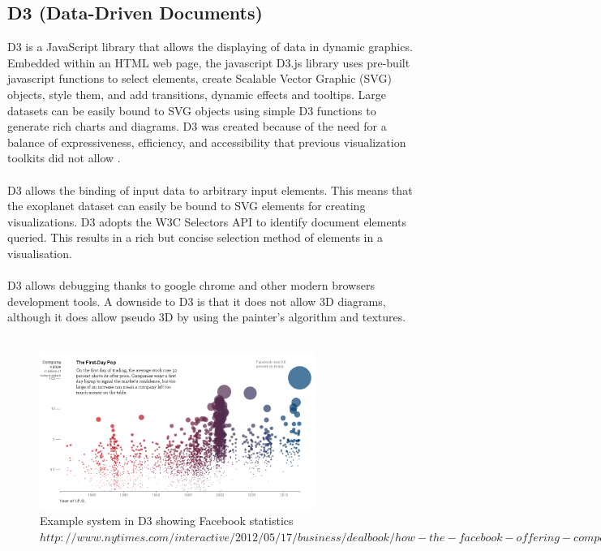\documentclass[11pt
              , a4paper
              , twoside
              , openright
              ]{report}
\begin{document}
\subsection{D3 (Data-Driven Documents)}
D3 is a JavaScript library that allows the displaying of data in dynamic graphics. Embedded within an HTML web page, the javascript D3.js library uses pre-built javascript functions to select elements, create Scalable Vector Graphic (SVG) objects, style them, and add transitions, dynamic effects and tooltips. Large datasets can be easily bound to SVG objects using simple D3 functions to generate rich charts and diagrams. D3 was created because of the need for a balance of expressiveness, efficiency, and accessibility that previous visualization toolkits did not allow \cite{d3}. 
\\\\
D3 allows the binding of input data to arbitrary input elements. This means that the exoplanet dataset can easily be bound to SVG elements for creating visualizations. D3 adopts the W3C Selectors API to identify document elements queried. This results in a rich but concise selection method of elements in a visualisation. 
\\\\
D3 allows debugging thanks to google chrome and other modern browsers development tools. A downside to D3 is that it does not allow 3D diagrams, although it does allow pseudo 3D by using the painter's algorithm and textures.
\\\\
\begin{figure}[h!]
  \centering
      \includegraphics[width=0.8\textwidth]{images/d31.jpg}
  \caption{Example system in D3 showing Facebook statistics $http://www.nytimes.com/interactive/2012/05/17/business/dealbook/how-the-facebook-offering-compares.html$}
\end{figure}
\end{document}
